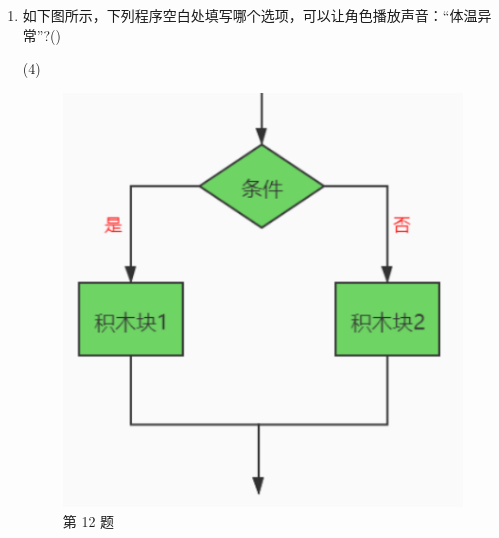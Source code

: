 \documentclass[10pt, a4paper]{article}
\begin{document}
\begin{enumerate}
        \item 如下图所示，下列程序空白处填写哪个选项，可以让角色播放声音：“体温异常”?(\qquad)
        \begin{tasks}(4)
        \end{tasks}
        
        \begin{figure}[htbp]
            \centering
            \begin{minipage}[t]{.2\textwidth}
                \centering
                \includegraphics[width=\textwidth]{12.png}
                \caption*{第 12 题}
            \end{minipage}
            \begin{minipage}[t]{.2\textwidth}
                \centering

\end{minipage}
\end{figure}
\end{enumerate}
\end{document}
